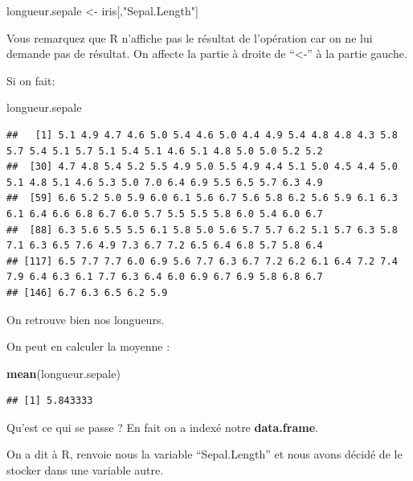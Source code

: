 \documentclass[
]{book}
\newenvironment{Shaded}{\begin{snugshade}}{\end{snugshade}}
\newcommand{\FunctionTok}[1]{\textcolor[rgb]{0.13,0.29,0.53}{\textbf{#1}}}
\newcommand{\NormalTok}[1]{#1}
\newcommand{\OtherTok}[1]{\textcolor[rgb]{0.56,0.35,0.01}{#1}}
\newcommand{\StringTok}[1]{\textcolor[rgb]{0.31,0.60,0.02}{#1}}
\begin{document}
\begin{Shaded}
\begin{Highlighting}[]
\NormalTok{longueur.sepale }\OtherTok{\textless{}{-}}\NormalTok{ iris[,}\StringTok{"Sepal.Length"}\NormalTok{]}
\end{Highlighting}
\end{Shaded}

Vous remarquez que R n'affiche pas le résultat de l'opération car on ne lui demande
pas de résultat. On affecte la partie à droite de ``\textless-'' à la partie gauche.

Si on fait:

\begin{Shaded}
\begin{Highlighting}[]
\NormalTok{longueur.sepale}
\end{Highlighting}
\end{Shaded}

\begin{verbatim}
##   [1] 5.1 4.9 4.7 4.6 5.0 5.4 4.6 5.0 4.4 4.9 5.4 4.8 4.8 4.3 5.8 5.7 5.4 5.1 5.7 5.1 5.4 5.1 4.6 5.1 4.8 5.0 5.0 5.2 5.2
##  [30] 4.7 4.8 5.4 5.2 5.5 4.9 5.0 5.5 4.9 4.4 5.1 5.0 4.5 4.4 5.0 5.1 4.8 5.1 4.6 5.3 5.0 7.0 6.4 6.9 5.5 6.5 5.7 6.3 4.9
##  [59] 6.6 5.2 5.0 5.9 6.0 6.1 5.6 6.7 5.6 5.8 6.2 5.6 5.9 6.1 6.3 6.1 6.4 6.6 6.8 6.7 6.0 5.7 5.5 5.5 5.8 6.0 5.4 6.0 6.7
##  [88] 6.3 5.6 5.5 5.5 6.1 5.8 5.0 5.6 5.7 5.7 6.2 5.1 5.7 6.3 5.8 7.1 6.3 6.5 7.6 4.9 7.3 6.7 7.2 6.5 6.4 6.8 5.7 5.8 6.4
## [117] 6.5 7.7 7.7 6.0 6.9 5.6 7.7 6.3 6.7 7.2 6.2 6.1 6.4 7.2 7.4 7.9 6.4 6.3 6.1 7.7 6.3 6.4 6.0 6.9 6.7 6.9 5.8 6.8 6.7
## [146] 6.7 6.3 6.5 6.2 5.9
\end{verbatim}

On retrouve bien nos longueurs.

On peut en calculer la moyenne :

\begin{Shaded}
\begin{Highlighting}[]
\FunctionTok{mean}\NormalTok{(longueur.sepale)}
\end{Highlighting}
\end{Shaded}

\begin{verbatim}
## [1] 5.843333
\end{verbatim}

Qu'est ce qui se passe ? En fait on a indexé notre \textbf{data.frame}.

On a dit à R, renvoie nous la variable ``Sepal.Length'' et nous avons décidé de le
stocker dans une variable autre.
\end{document}
